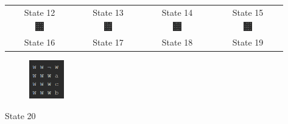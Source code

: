 \documentclass{article}
\begin{document}
\begin{appendices}
\begin{center}
\begin{tabular}{c c c c}
				State 12 & State 13 & State 14 & State 15 \\
				\includegraphics[width=0.135\textwidth,keepaspectratio]{State-16.png} & \includegraphics[width=0.135\textwidth,keepaspectratio]{State-17.png} & \includegraphics[width=0.135\textwidth,keepaspectratio]{State-18.png} & \includegraphics[width=0.135\textwidth,keepaspectratio]{State-19.png} \\
				State 16 & State 17 & State 18 & State 19
			\end{tabular}
		
			\begin{figure}[h]	
				\centering
				\includegraphics[width=0.135\textwidth,keepaspectratio]{State-20.png}
			\end{figure} 
			State 20
		\end{center} 
		
	\end{appendices}
	
\end{document}
